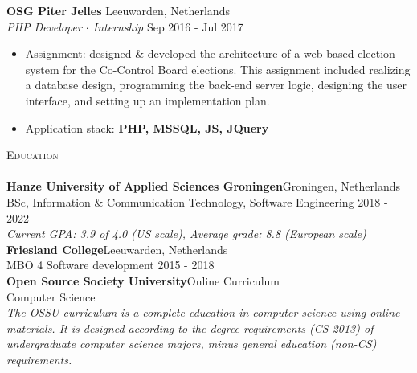 \documentclass[a4paper]{article}
\newcommand{\lineunder} {
    \vspace*{-8pt} \\
    \hspace*{-18pt} \hrulefill \\
}
\newcommand{\header} [1] {
    {\hspace*{-18pt}\vspace*{6pt} \textsc{#1}}
    \vspace*{-6pt} \lineunder
}
\begin{document}
\textbf{OSG Piter Jelles} \hfill Leeuwarden, Netherlands\\
\textit{PHP Developer $\cdot$ Internship} \hfill Sep 2016 - Jul 2017\\
\vspace{-1mm}
\begin{itemize} \itemsep 1pt
	\item Assignment: designed \& developed the architecture of a web-based election system for the Co-Control Board elections. This assignment included realizing a database design, programming the back-end server logic, designing the user interface, and setting up an implementation plan. 
	\item Application stack: \textbf{PHP, MSSQL, JS, JQuery}
\end{itemize}

\header{Education}
\vspace{2mm}
\textbf{Hanze University of Applied Sciences Groningen}\hfill Groningen, Netherlands\\
BSc, Information \& Communication Technology, Software Engineering \hfill 2018 - 2022\\
\vspace{1mm}
\emph{Current GPA: 3.9 of 4.0 (US scale), Average grade: 8.8 (European scale)}\\
\vspace{2mm}
\textbf{Friesland College}\hfill Leeuwarden, Netherlands\\
MBO 4 Software development \hfill 2015 - 2018\\
\vspace{2mm}
\textbf{Open Source Society University}\hfill Online Curriculum \\
Computer Science\\ 
\vspace{1mm}
\emph{The OSSU curriculum is a complete education in computer science using online materials. It is designed according to the degree requirements (CS 2013) of undergraduate computer science majors, minus general education (non-CS) requirements.}\\

\newpage
\end{document}
